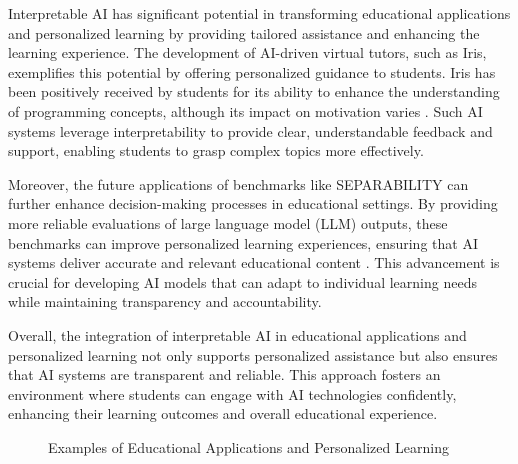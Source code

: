 Interpretable AI has significant potential in transforming educational applications and personalized learning by providing tailored assistance and enhancing the learning experience. The development of AI-driven virtual tutors, such as Iris, exemplifies this potential by offering personalized guidance to students. Iris has been positively received by students for its ability to enhance the understanding of programming concepts, although its impact on motivation varies \cite{bassner2024irisaidrivenvirtualtutor}. Such AI systems leverage interpretability to provide clear, understandable feedback and support, enabling students to grasp complex topics more effectively.



Moreover, the future applications of benchmarks like SEPARABILITY can further enhance decision-making processes in educational settings. By providing more reliable evaluations of large language model (LLM) outputs, these benchmarks can improve personalized learning experiences, ensuring that AI systems deliver accurate and relevant educational content \cite{ghosh2024comparedespairreliablepreference}. This advancement is crucial for developing AI models that can adapt to individual learning needs while maintaining transparency and accountability.



Overall, the integration of interpretable AI in educational applications and personalized learning not only supports personalized assistance but also ensures that AI systems are transparent and reliable. This approach fosters an environment where students can engage with AI technologies confidently, enhancing their learning outcomes and overall educational experience.






{
\begin{figure}[ht!]
\centering
{}\hspace{0.03\textwidth}
\hspace{0.03\textwidth}
\hspace{0.03\textwidth}
\caption{Examples of Educational Applications and Personalized Learning}\label{fig:retrieve_fig_2}
\end{figure}
}



